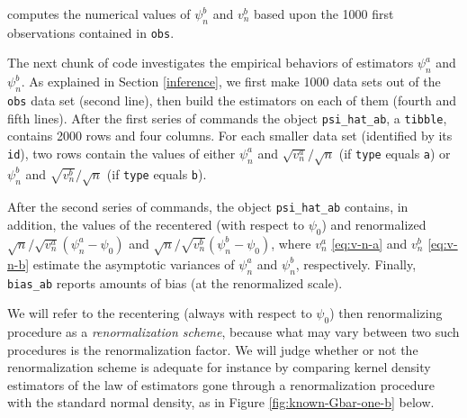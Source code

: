 \documentclass[
  11pt,
  openright,twoside]{book}
\theoremstyle{definition}
\theoremstyle{definition}
\theoremstyle{definition}
\theoremstyle{definition}
\theoremstyle{remark}
\begin{document}
computes the numerical values of \(\psi_{n}^{b}\) and \(v_{n}^{b}\) based
upon the 1000 first observations contained in \texttt{obs}.

The next chunk of code investigates the empirical behaviors of estimators
\(\psi_{n}^{a}\) and \(\psi_{n}^{b}\). As explained in Section \ref{inference},
we first make 1000 data sets out of the \texttt{obs} data set (second line), then
build the estimators on each of them (fourth and fifth lines). After the first
series of commands the object \texttt{psi\_hat\_ab}, a \texttt{tibble}, contains 2000
rows and four columns. For each smaller data set (identified by its \texttt{id}),
two rows contain the values of either \(\psi_{n}^{a}\) and
\(\sqrt{v_{n}^{a}}/\sqrt{n}\) (if \texttt{type} equals \texttt{a}) or \(\psi_{n}^{b}\) and
\(\sqrt{v_{n}^{b}}/\sqrt{n}\) (if \texttt{type} equals \texttt{b}).

After the second series of commands, the object \texttt{psi\_hat\_ab} contains, in
addition, the values of the recentered (with respect to \(\psi_{0}\)) and
renormalized \(\sqrt{n}/\sqrt{v_{n}^{a}} (\psi_{n}^{a} - \psi_{0})\) and
\(\sqrt{n}/\sqrt{v_{n}^{b}} (\psi_{n}^{b} - \psi_{0})\), where \(v_{n}^{a}\)
\eqref{eq:v-n-a} and \(v_{n}^{b}\) \eqref{eq:v-n-b} estimate the asymptotic
variances of \(\psi_{n}^{a}\) and \(\psi_{n}^{b}\), respectively. Finally,
\texttt{bias\_ab} reports amounts of bias (at the renormalized scale).

We will refer to the recentering (always with respect to \(\psi_{0}\)) then
renormalizing procedure as a \emph{renormalization scheme}, because what may vary
between two such procedures is the renormalization factor. We will judge
whether or not the renormalization scheme is adequate for instance by
comparing kernel density estimators of the law of estimators gone through a
renormalization procedure with the standard normal density, as in Figure
\ref{fig:known-Gbar-one-b} below.
\end{document}
